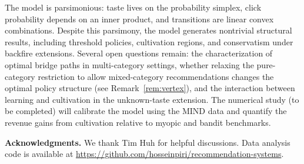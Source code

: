 \documentclass[11pt]{article}
\begin{document}
The model is parsimonious: taste lives on the probability simplex, click probability depends on an inner product, and transitions are linear convex combinations. Despite this parsimony, the model generates nontrivial structural results, including threshold policies, cultivation regions, and conservatism under backfire extensions. Several open questions remain: the characterization of optimal bridge paths in multi-category settings, whether relaxing the pure-category restriction to allow mixed-category recommendations changes the optimal policy structure (see Remark~\ref{rem:vertex}), and the interaction between learning and cultivation in the unknown-taste extension. The numerical study (to be completed) will calibrate the model using the MIND data and quantify the revenue gains from cultivation relative to myopic and bandit benchmarks.

\bigskip

\noindent\textbf{Acknowledgments.} We thank Tim Huh for helpful discussions. Data analysis code is available at \url{https://github.com/hosseinpiri/recommendation-systems}.
\end{document}
